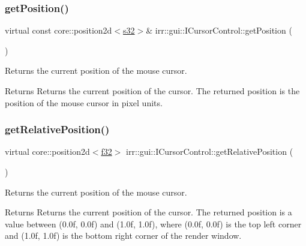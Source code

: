 \subsubsection{\texorpdfstring{get\+Position()}{getPosition()}}
{\footnotesize\ttfamily virtual const core\+::position2d$<$\hyperlink{namespaceirr_ac66849b7a6ed16e30ebede579f9b47c6}{s32}$>$\& irr\+::gui\+::\+I\+Cursor\+Control\+::get\+Position (\begin{DoxyParamCaption}{ }\end{DoxyParamCaption})\hspace{0.3cm}{\ttfamily [pure virtual]}}



Returns the current position of the mouse cursor. 

\begin{DoxyReturn}{Returns}
Returns the current position of the cursor. The returned position is the position of the mouse cursor in pixel units. 
\end{DoxyReturn}
\mbox{\label{classirr_1_1gui_1_1ICursorControl_a8ba1cb0ff11edc5fb32cdadddece09f8}} 
\subsubsection{\texorpdfstring{get\+Relative\+Position()}{getRelativePosition()}}
{\footnotesize\ttfamily virtual core\+::position2d$<$\hyperlink{namespaceirr_a0277be98d67dc26ff93b1a6a1d086b07}{f32}$>$ irr\+::gui\+::\+I\+Cursor\+Control\+::get\+Relative\+Position (\begin{DoxyParamCaption}{ }\end{DoxyParamCaption})\hspace{0.3cm}{\ttfamily [pure virtual]}}



Returns the current position of the mouse cursor. 

\begin{DoxyReturn}{Returns}
Returns the current position of the cursor. The returned position is a value between (0.\+0f, 0.\+0f) and (1.\+0f, 1.\+0f), where (0.\+0f, 0.\+0f) is the top left corner and (1.\+0f, 1.\+0f) is the bottom right corner of the render window. 
\end{DoxyReturn}
\mbox{\label{classirr_1_1gui_1_1ICursorControl_ae1d1ca4c1c3042388881fabda4e53a42}} 
